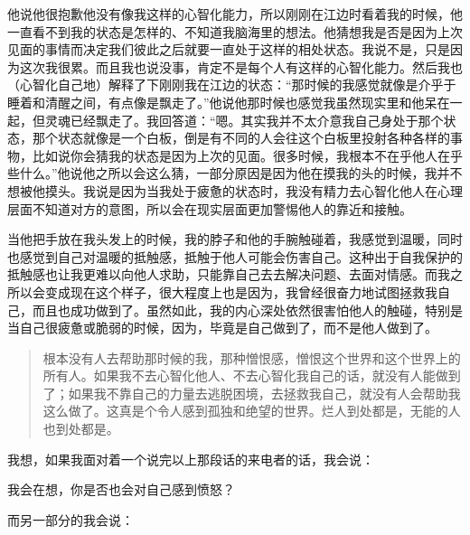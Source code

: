 他说他很抱歉他没有像我这样的心智化能力，所以刚刚在江边时看着我的时候，他一直看不到我的状态是怎样的、不知道我脑海里的想法。他猜想我是否是因为上次见面的事情而决定我们彼此之后就要一直处于这样的相处状态。我说不是，只是因为这次我很累。而且我也说没事，肯定不是每个人有这样的心智化能力。然后我也（心智化自己地）解释了下刚刚我在江边的状态：“那时候的我感觉就像是介乎于睡着和清醒之间，有点像是飘走了。”他说他那时候也感觉我虽然现实里和他呆在一起，但灵魂已经飘走了。我回答道：“嗯。其实我并不太介意我自己身处于那个状态，那个状态就像是一个白板，倒是有不同的人会往这个白板里投射各种各样的事物，比如说你会猜我的状态是因为上次的见面。很多时候，我根本不在乎他人在乎些什么。”他说他之所以会这么猜，一部分原因是因为他在摸我的头的时候，我并不想被他摸头。我说是因为当我处于疲惫的状态时，我没有精力去心智化他人\pozhehao{}在心理层面不知道对方的意图，所以会在现实层面更加警惕他人的靠近和接触。

当他把手放在我头发上的时候，我的脖子和他的手腕触碰着，我感觉到温暖，同时也感觉到自己对温暖的抵触感，抵触于他人可能会伤害自己。这种出于自我保护的抵触感也让我更难以向他人求助，只能靠自己去去解决问题、去面对情感。而我之所以会变成现在这个样子，很大程度上也是因为，我曾经很奋力地试图拯救我自己，而且也成功做到了。虽然如此，我的内心深处依然很害怕他人的触碰，特别是当自己很疲惫或脆弱的时候，因为，毕竟是自己做到了，而不是他人做到了。

\blockquote{
根本没有人去帮助那时候的我，那种憎恨感，憎恨这个世界和这个世界上的所有人。如果我不去心智化他人、不去心智化我自己的话，就没有人能做到了；如果我不靠自己的力量去逃脱困境，去拯救我自己，就没有人会帮助我这么做了。这真是个令人感到孤独和绝望的世界。烂人到处都是，无能的人也到处都是。
}

我想，如果我面对着一个说完以上那段话的来电者的话，我会说：

\begin{compactitem}
\item 我会在想，你是否也会对自己感到愤怒？
\end{compactitem}

而另一部分的我会说：

